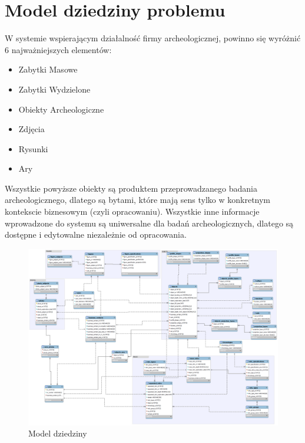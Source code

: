 \section{Model dziedziny problemu}
W systemie wspierającym działalność firmy archeologicznej, powinno się wyróżnić 6 najważniejszych elementów:
\begin{itemize}
\item Zabytki Masowe\\
\item Zabytki Wydzielone\\
\item Obiekty Archeologiczne\\
\item Zdjęcia\\
\item Rysunki\\
\item Ary
\end{itemize}

Wszystkie powyższe obiekty są produktem przeprowadzanego badania archeologicznego, dlatego są bytami, które mają sens tylko w konkretnym kontekscie biznesowym (czyli opracowaniu). Wszystkie inne informacje wprowadzone do systemu są uniwersalne dla badań archeologicznych, dlatego są dostępne i edytowalne niezależnie od opracowania.
\newpage
\begin{figure} [H]
    \begin{center}
	\includegraphics[angle=90, scale=.26]{img/db.png}
	\caption{Model dziedziny}
	\label{modelDziedziny}
    \end{center}
\end{figure}

